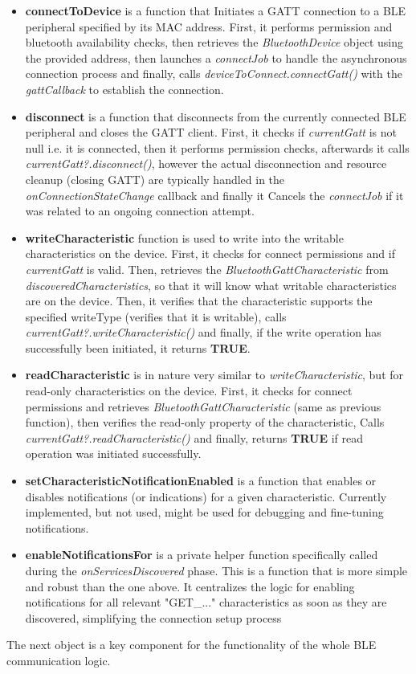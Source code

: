 \begin{itemize}
	\item \textbf{connectToDevice} is a function that Initiates a \ac{GATT} connection to a \ac{BLE} peripheral specified by its \ac{MAC} address. First, it performs permission and bluetooth availability checks, then retrieves the \textit{BluetoothDevice} object using the provided address, then launches a \textit{connectJob} to handle the asynchronous connection process and finally, calls \textit{deviceToConnect.connectGatt()} with the \textit{gattCallback} to establish the connection.
	\item \textbf{disconnect} is a function that disconnects from the currently connected \ac{BLE} peripheral and closes the \ac{GATT} client. First, it checks if \textit{currentGatt} is not null i.e. it is connected, then it performs permission checks, afterwards it calls \textit{currentGatt?.disconnect()}, however the actual disconnection and resource cleanup (closing \ac{GATT}) are typically handled in the \textit{onConnectionStateChange} callback and finally it  Cancels the \textit{connectJob} if it was related to an ongoing connection attempt.
	\item \textbf{writeCharacteristic} function is used to write into the writable characteristics on the device. First, it checks for connect permissions and if \textit{currentGatt} is valid. Then, retrieves the \textit{BluetoothGattCharacteristic} from \textit{discoveredCharacteristics}, so that it will know what writable characteristics are on the device. Then, it verifies that the characteristic supports the specified writeType (verifies that it is writable), calls \textit{currentGatt?.writeCharacteristic()} and finally, if the write operation has successfully been initiated, it returns \textbf{TRUE}.
	\item \textbf{readCharacteristic} is in nature very similar to \textit{writeCharacteristic}, but for read-only characteristics on the device. First, it checks for connect permissions and retrieves \textit{BluetoothGattCharacteristic} (same as previous function), then verifies the read-only property of the characteristic,  Calls \textit{currentGatt?.readCharacteristic()} and finally, returns \textbf{TRUE} if read operation was initiated successfully.
	\item \textbf{setCharacteristicNotificationEnabled} is a function that enables or disables notifications (or indications) for a given characteristic. Currently implemented, but not used, might be used for debugging and fine-tuning notifications.
	\item \textbf{enableNotificationsFor} is a private helper function specifically called during the \textit{onServicesDiscovered} phase. This is a function that is more simple and robust than the one above. It centralizes the logic for enabling notifications for all relevant "GET\_..." characteristics as soon as they are discovered, simplifying the connection setup process
\end{itemize}
The next object is a key component for the functionality of the whole \ac{BLE} communication logic. 

